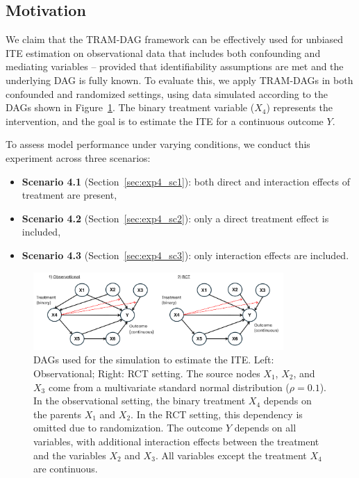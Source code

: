 \subsection{Motivation}

We claim that the TRAM-DAG framework can be effectively used for unbiased ITE estimation on observational data that includes both confounding and mediating variables -- provided that identifiability assumptions are met and the underlying DAG is fully known. To evaluate this, we apply TRAM-DAGs in both confounded and randomized settings, using data simulated according to the DAGs shown in Figure~\ref{fig:ite_dag_observational}. The binary treatment variable ($X_4$) represents the intervention, and the goal is to estimate the ITE for a continuous outcome $Y$.

To assess model performance under varying conditions, we conduct this experiment across three scenarios:  

\begin{itemize}
    \item \textbf{Scenario 4.1} (Section~\ref{sec:exp4_sc1}): both direct and interaction effects of treatment are present,
    \item \textbf{Scenario 4.2} (Section~\ref{sec:exp4_sc2}): only a direct treatment effect is included,
    \item \textbf{Scenario 4.3} (Section~\ref{sec:exp4_sc3}): only interaction effects are included.
\end{itemize}


\begin{figure}[H]
\centering
\includegraphics[width=0.85\textwidth]{img/exp4_dags.png}
\caption{DAGs used for the simulation to estimate the ITE. Left: Observational; Right: RCT setting. The source nodes $X_1$, $X_2$, and $X_3$ come from a multivariate standard normal distribution ($\rho=0.1$). In the observational setting, the binary treatment $X_4$ depends on the parents $X_1$ and $X_2$. In the RCT setting, this dependency is omitted due to randomization. The outcome $Y$ depends on all variables, with additional interaction effects between the treatment and the variables $X_2$ and $X_3$. All variables except the treatment $X_4$ are continuous.}
\label{fig:ite_dag_observational}
\end{figure}

